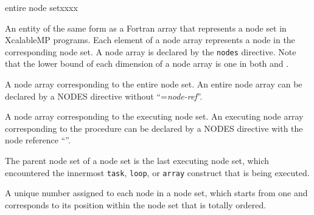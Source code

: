 \begin{namelist}{entire node setxxxx}

 An {\XMP} entity of the same form as a Fortran array that represents a
 node set in XcalableMP programs. Each element of a node array
 represents a node in the corresponding node set. A node array is
 declared by the {\tt nodes} directive. Note that the lower bound of
 each dimension of a node array is one in both {\XMPF} and {\XMPC}.



 A node array corresponding to the entire node set.
 An entire node array can be declared by a NODES directive
 without ``={\it node-ref}''.


 A node array corresponding to the executing node set.
 An executing node array corresponding to the procedure
 can be declared by a NODES directive with the node reference ``{\tt *}''.


 The parent node set of a node set is the last executing node set, which
 encountered the innermost {\tt task}, {\tt loop}, or {\tt array}
 construct that is being executed.

A unique number assigned to each node in a node set, which starts from
one and corresponds to its position within the node set that is
totally ordered.

%


\end{namelist}

